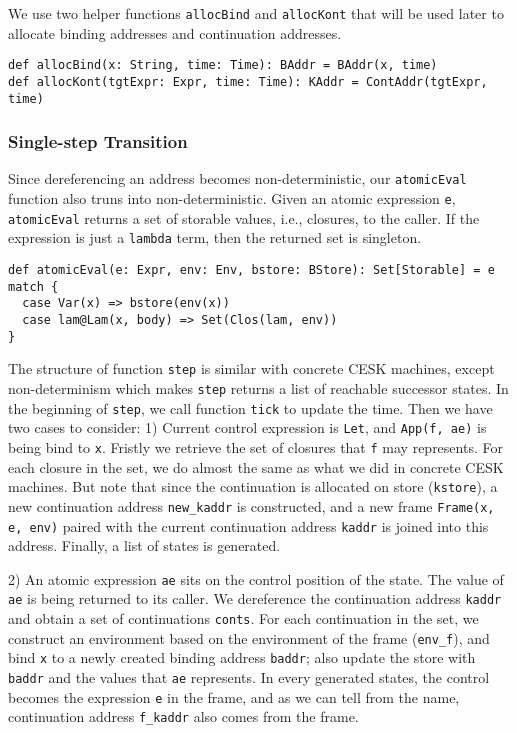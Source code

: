 \documentclass[acmsmall,review,anonymous]{acmart}\settopmatter{printfolios=true,printccs=false,printacmref=false}
\begin{document}
We use two helper functions \texttt{allocBind} and \texttt{allocKont} that will be used later
to allocate binding addresses and continuation addresses.

\begin{verbatim}
def allocBind(x: String, time: Time): BAddr = BAddr(x, time)
def allocKont(tgtExpr: Expr, time: Time): KAddr = ContAddr(tgtExpr, time)
\end{verbatim}

\subsubsection{Single-step Transition}

Since dereferencing an address becomes non-deterministic, our \texttt{atomicEval}
function also truns into non-deterministic. Given an atomic expression \texttt{e},
\texttt{atomicEval} returns a set of storable values, i.e., closures, to the caller.
If the expression is just a \texttt{lambda} term, then the returned set is singleton.

\begin{verbatim}
def atomicEval(e: Expr, env: Env, bstore: BStore): Set[Storable] = e match {
  case Var(x) => bstore(env(x))
  case lam@Lam(x, body) => Set(Clos(lam, env))
}
\end{verbatim}

The structure of function \texttt{step} is similar with concrete CESK machines, 
except non-determinism which makes \texttt{step} returns a list of reachable 
successor states.
In the beginning of \texttt{step}, we call function \texttt{tick} to update 
the time.
Then we have two cases to consider: 1) Current control expression is \texttt{Let},
and \texttt{App(f, ae)} is being bind to \texttt{x}.
Fristly we retrieve the set of closures that \texttt{f} may represents.
For each closure in the set, we do almost the same as what we did in concrete 
CESK machines. But note that since the continuation is allocated on store (\texttt{kstore}),
a new continuation address \texttt{new_kaddr} is constructed, and a new frame
\texttt{Frame(x, e, env)} paired with the current continuation address \texttt{kaddr}
is joined into this address. Finally, a list of states is generated.

2) An atomic expression \texttt{ae} sits on the control position of the state.
The value of \texttt{ae} is being returned to its caller. 
We dereference the continuation address \texttt{kaddr} and obtain a set of
continuations \texttt{conts}.
For each continuation in the set, we construct an environment based on the
environment of the frame (\texttt{env_f}), and bind \texttt{x} to a newly created binding 
address \texttt{baddr}; also update the store with \texttt{baddr} and 
the values that \texttt{ae} represents. In every generated states,
the control becomes the expression \texttt{e} in the frame,
and as we can tell from the name, continuation address \texttt{f_kaddr} 
also comes from the frame.
\end{document}
